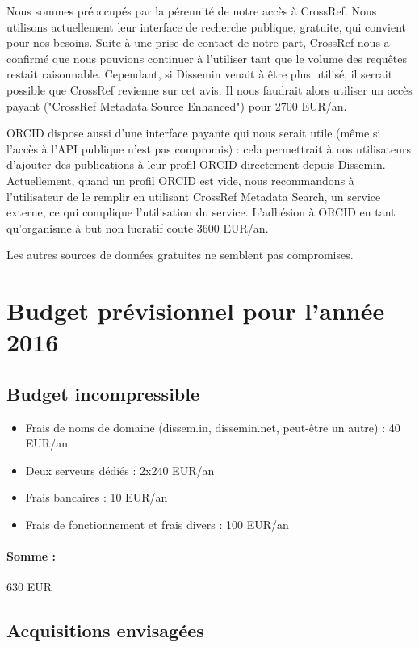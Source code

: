 \documentclass[a4paper]{article}
\begin{document}
Nous sommes préoccupés par la pérennité de notre accès à CrossRef. Nous utilisons actuellement leur interface de recherche publique, gratuite, qui convient pour nos besoins.
Suite à une prise de contact de notre part, CrossRef nous a confirmé que nous pouvions continuer à l'utiliser
tant que le volume des requêtes restait raisonnable. 
Cependant, si Dissemin venait à être plus utilisé, il serrait possible que CrossRef revienne sur cet avis. Il nous faudrait alors utiliser un accès
payant ("CrossRef Metadata Source Enhanced") pour 2700 EUR/an.

ORCID dispose aussi d'une interface payante qui nous serait utile (même si l'accès à l'API publique n'est pas compromis) : cela permettrait à nos utilisateurs d'ajouter des publications à leur profil ORCID
directement depuis Dissemin. Actuellement, quand un profil ORCID est vide, nous recommandons à l'utilisateur de le remplir en utilisant CrossRef Metadata Search, un service externe, ce qui complique
l'utilisation du service. L'adhésion à ORCID en tant qu'organisme à but non lucratif coute 3600 EUR/an.

Les autres sources de données gratuites ne semblent pas compromises.

\section{Budget prévisionnel pour l'année 2016}

\subsection{Budget incompressible}

\begin{itemize}
    \item Frais de noms de domaine (dissem.in, dissemin.net, peut-être un autre) : 40 EUR/an
    \item Deux serveurs dédiés : 2x240 EUR/an %
    \item Frais bancaires : 10 EUR/an
    \item Frais de fonctionnement et frais divers : 100 EUR/an
\end{itemize}

\paragraph{Somme :} 630 EUR

\subsection{Acquisitions envisagées}
    
\end{document}
